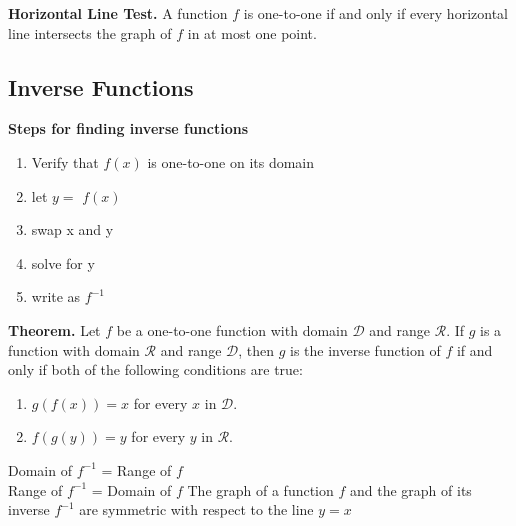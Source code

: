 \documentclass{report}
\begin{document}
    \bigbreak \noindent 
    \begin{mdframed}
      \textbf{Horizontal Line Test.}
      \bigbreak \noindent 
      A function $f$ is one-to-one if and only if every horizontal line intersects the graph of $f$ in at most one point.
    \end{mdframed}

    \pagebreak \bigbreak \noindent 
    \subsection{Inverse Functions}

    \bigbreak \noindent 
    \begin{mdframed}
      \textbf{Steps for finding inverse functions}
      \begin{enumerate}
        \item Verify that $f(x)$ is one-to-one on its domain
        \item let $y =$ $f(x)$
        \item swap x and y
        \item solve for y 
        \item write as $f^{-1} $
      \end{enumerate}
    \end{mdframed}

    \bigbreak \noindent 
    \begin{mdframed}
      \textbf{Theorem.}
      \bigbreak \noindent 
      Let $f$ be a one-to-one function with domain $\mathcal{D}$ and range $\mathcal{R}$. If $g$ is a function with domain $\mathcal{R}$ and range $\mathcal{D}$, then $g$ is the inverse function of $f$ if and only if both of the following conditions are true:
      \begin{enumerate}
          \item $g(f(x)) = x$ for every $x$ in $\mathcal{D}$.
          \item $f(g(y)) = y$ for every $y$ in $\mathcal{R}$.
      \end{enumerate}
      \bigbreak \noindent 
      Domain of $f^{-1}$ = Range of $f$ \\
      Range of $f^{-1}$ = Domain of $f$
      \bigbreak \noindent 
      The graph of a function $f$ and the graph of its inverse $f^{-1} $ are symmetric with respect to the line $y=x $
    \end{mdframed}
\end{document}
